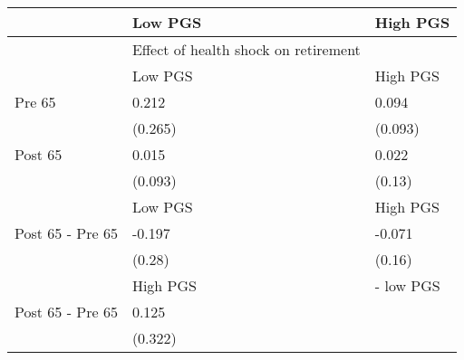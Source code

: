 % 
\begin{tabular}{lll}
  \hline
 & Low PGS & High PGS \\ 
  \hline
 & Effect of health shock on retirement &  \\ 
   & Low PGS & High PGS \\ 
  Pre 65 & 0.212 & 0.094 \\ 
   & (0.265) & (0.093) \\ 
  Post 65 & 0.015 & 0.022 \\ 
   & (0.093) & (0.13) \\ 
   & Low PGS & High PGS \\ 
  Post 65 - Pre 65 & -0.197 & -0.071 \\ 
   & (0.28) & (0.16) \\ 
   & High PGS  & - low PGS \\ 
  Post 65 - Pre 65 & 0.125 &  \\ 
   & (0.322) &  \\ 
   \hline
\end{tabular}
